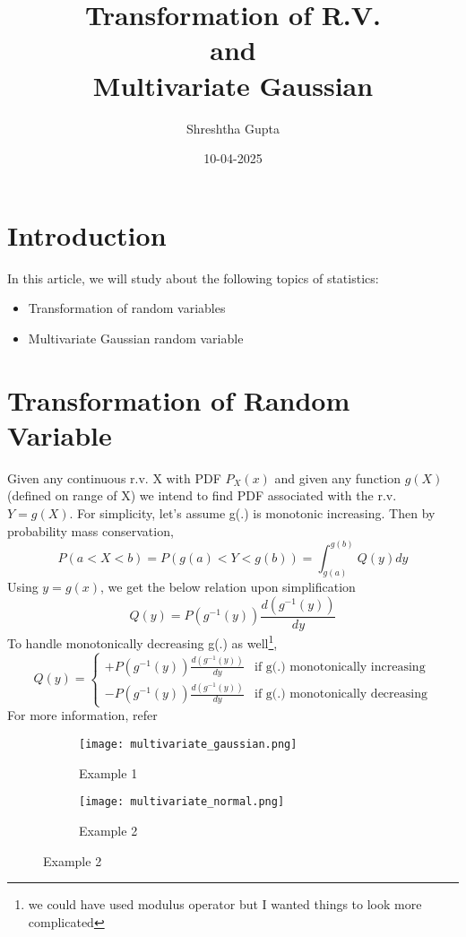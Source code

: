 \documentclass{article}
\begin{document}
\title{Transformation of R.V.\\and\\Multivariate Gaussian}
\author{Shreshtha Gupta}
\date{10-04-2025}
\maketitle
\tableofcontents
\clearpage
\pagestyle{fancy}
\fancyhf{}
\section{Introduction}
In this article, we will study about the following topics of statistics:
\begin{itemize}
\item Transformation of random variables
\item Multivariate Gaussian random variable
\end{itemize}
\section{Transformation of Random Variable}
Given any continuous r.v. X with PDF \(P_{X}(x)\) and given any function \(g(X)\)(defined on range of X) we intend to find PDF associated with the r.v. \(Y = g(X)\).
For simplicity, let's assume g(.) is monotonic increasing.
Then by probability mass conservation,
\[ P(a < X < b)=P(g(a) < Y < g(b)) = \int_{g(a)}^{g(b)}Q(y)dy \]
Using \(y = g(x)\), we get the below relation upon simplification
\[Q(y) = P(g^{-1}(y))\frac{d(g^{-1}(y))}{dy}\]
To handle monotonically decreasing g(.) as well\footnote{we could have used modulus operator but I wanted things to look more complicated},
\begin{equation}
Q(y) =
\begin{cases}
+P(g^{-1}(y))\frac{d(g^{-1}(y))}{dy} & \text{if g(.) monotonically increasing} \\
-P(g^{-1}(y))\frac{d(g^{-1}(y))}{dy} & \text{if g(.) monotonically decreasing}
\end{cases}
\end{equation}
For more information, refer \cite{transformations} 



\begin{figure}[h]
    \centering
    \begin{subfigure}[b]{0.45\textwidth}
        \texttt{[image: multivariate\_gaussian.png]}
        \caption{Example 1}
        \label{1a}
    \end{subfigure}
    \hfill
    \begin{subfigure}[b]{0.45\textwidth}
        \texttt{[image: multivariate\_normal.png]}
        \caption{Example 2}
        \label{1b}
    \end{subfigure}
\end{figure}
\end{document}
